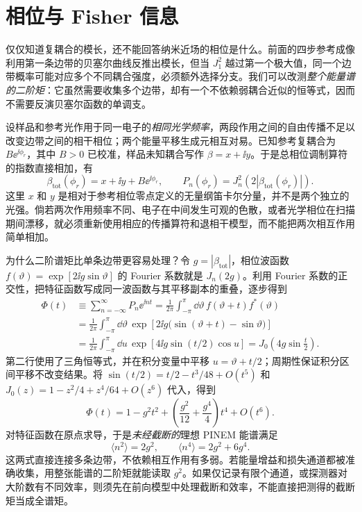 \medskip
\section{相位与 Fisher 信息}
\noindent 仅仅知道复耦合的模长，还不能回答纳米近场的相位是什么。前面的四步参考成像利用第一条边带的贝塞尔曲线反推出模长，但当 $J_1^2$ 越过第一个极大值，同一个边带概率可能对应多个不同耦合强度，必须额外选择分支。我们可以改测\emph{整个能量谱的二阶矩}：它虽然需要收集多个边带，却有一个不依赖弱耦合近似的恒等式，因而不需要反演贝塞尔函数的单调支。

设样品和参考光作用于同一电子的\emph{相同光学频率}，两段作用之间的自由传播不足以改变边带之间的相干相位；两个能量平移生成元相互对易。已知参考复耦合为 $B\ee^{\ii\phi_r}$，其中 $B>0$ 已校准，样品未知耦合写作 $\beta=x+\ii y$。于是总相位调制算符的指数直接相加，有
\begin{equation}
\beta_{\mathrm{tot}}(\phi_r)=x+\ii y+B\ee^{\ii\phi_r},\qquad
P_n(\phi_r)=J_n^2\!\left(2|\beta_{\mathrm{tot}}(\phi_r)|\right).
\label{eq:phase-reference-composition}
\end{equation}
这里 $x$ 和 $y$ 是相对于参考相位零点定义的无量纲笛卡尔分量，并不是两个独立的光强。倘若两次作用频率不同、电子在中间发生可观的色散，或者光学相位在扫描期间漂移，就必须重新使用相应的传播算符和退相干模型，而不能把两次相互作用简单相加。

为什么二阶谱矩比单条边带更容易处理？令 $g=|\beta_{\mathrm{tot}}|$，相位波函数 $f(\vartheta)=\exp[2\ii g\sin\vartheta]$ 的 Fourier 系数就是 $J_n(2g)$。利用 Fourier 系数的正交性，把特征函数写成同一波函数与其平移副本的重叠，逐步得到
\begin{align*}
\Phi(t)&\equiv\sum_{n=-\infty}^{\infty}P_n\ee^{\ii nt}
=\frac{1}{2\pi}\int_{-\pi}^{\pi}\dd\vartheta\,f(\vartheta+t)f^*(\vartheta)\\
&=\frac{1}{2\pi}\int_{-\pi}^{\pi}\dd\vartheta\,
\exp\!\left[2\ii g\bigl(\sin(\vartheta+t)-\sin\vartheta\bigr)\right]\\
&=\frac{1}{2\pi}\int_{-\pi}^{\pi}\dd u\,
\exp\!\left[4\ii g\sin(t/2)\cos u\right]
=J_0\!\left(4g\sin\frac{t}{2}\right).
\end{align*}
第二行使用了三角恒等式，并在积分变量中平移 $u=\vartheta+t/2$；周期性保证积分区间平移不改变结果。将 $\sin(t/2)=t/2-t^3/48+O(t^5)$ 和 $J_0(z)=1-z^2/4+z^4/64+O(z^6)$ 代入，得到
\[
\Phi(t)=1-g^2t^2+\left(\frac{g^2}{12}+\frac{g^4}{4}\right)t^4+O(t^6).
\]
对特征函数在原点求导，于是\emph{未经截断的}理想 PINEM 能谱满足
\begin{equation}
\langle n^2\rangle=2g^2,\qquad
\langle n^4\rangle=2g^2+6g^4.
\label{eq:phase-reference-moments}
\end{equation}
这两式直接连接多条边带，不依赖相互作用有多弱。若能量增益和损失通道都被准确收集，用整张能谱的二阶矩就能读取 $g^2$。如果仅记录有限个通道，或探测器对大阶数有不同效率，则须先在前向模型中处理截断和效率，不能直接把测得的截断矩当成全谱矩。

